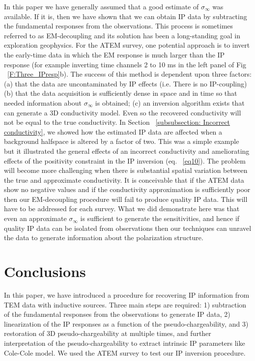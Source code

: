 \documentclass[extra,mreferee]{gji}
\newcommand{\siginf}{\sigma_\infty}
\begin{document}
In this paper we have generally assumed that a good estimate of $\siginf$ was available. If it is, then we have shown that we can obtain IP data by subtracting the fundamental responses from the observations. This process is sometimes referred to as EM-decoupling and its solution has been a long-standing goal in exploration geophysics. For the ATEM survey, one potential approach is to invert the early-time data in which the EM response is much larger than the IP response (for example inverting time channels 2 to 10 ms in the left panel of Fig ~\ref{F:Three_IPresp}b). The success of this method is dependent upon three factors: (a) that the data are uncontaminated by IP effects (i.e. There is no IP-coupling) (b) that the data acquisition is sufficiently dense in space and in time so that needed information about $\siginf$ is obtained; (c) an inversion algorithm exists that can generate a 3D conductivity model. Even so the recovered conductivity will not be equal to the true conductivity. In Section ~\ref{subsubsection: Incorrect conductivity}, we showed how the estimated IP data are affected when a background halfspace is altered by a factor of two. This was a simple example but it illustrated the general effects of an incorrect conductivity and ameliorating effects of the positivity constraint in the IP inversion (eq. ~\ref{eq10}). The problem will become more challenging when there is substantial spatial variation between the true and approximate conductivity. It is conceivable that if the ATEM data show no negative values and if the conductivity approximation is sufficiently poor then our EM-decoupling procedure will fail to produce quality IP data. This will have to be addressed for each survey. What we did demonstrate here was that even an approximate $\siginf$ is sufficient to generate the sensitivities, and hence if quality IP data can be isolated from observations then our techniques can unravel the data to generate information about the polarization structure.

\section{Conclusions}
In this paper, we have introduced a procedure for recovering IP information from TEM data with inductive sources. Three main steps are required: 1) subtraction of the fundamental responses from the observations to generate IP data, 2) linearization of the IP responses as a function of the pseudo-chargeability, and 3) restoration of 3D pseudo-chargeability at multiple times, and further interpretation of the pseudo-chargeability to extract intrinsic IP parameters like Cole-Cole model. We used the ATEM survey to test our IP inversion procedure.
\end{document}
